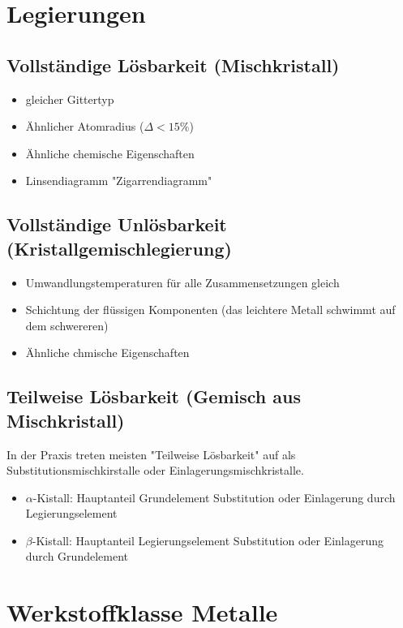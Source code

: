\documentclass[8.5pt,twocolumn]{extarticle}
\begin{document}
    \section*{Legierungen}
    \subsection{Vollständige Lösbarkeit (Mischkristall)}
    \begin{itemize}[label={}, leftmargin=*,  itemsep=0.01em]
        \item gleicher Gittertyp
        \item Ähnlicher Atomradius ($\Delta < 15\%$)
        \item Ähnliche chemische Eigenschaften
        \item Linsendiagramm "Zigarrendiagramm"
    \end{itemize}
    \subsection{Vollständige Unlösbarkeit (Kristallgemischlegierung)}
    \begin{itemize}[label={}, leftmargin=*,  itemsep=0.01em]
        \item Umwandlungstemperaturen für alle Zusammensetzungen gleich
        \item Schichtung der flüssigen Komponenten (das leichtere Metall schwimmt auf dem
        schwereren)
        \item Ähnliche chmische Eigenschaften
    \end{itemize}
    \subsection{Teilweise Lösbarkeit (Gemisch aus Mischkristall)}
    In der Praxis treten meisten "Teilweise Lösbarkeit" auf als Substitutionsmischkirstalle oder Einlagerungsmischkristalle.
    \begin{itemize}[label={}, leftmargin=*, itemsep=0.01em]
        \item $\alpha$-Kistall: Hauptanteil Grundelement Substitution oder Einlagerung durch Legierungselement
        \item $\beta$-Kistall: Hauptanteil Legierungselement Substitution oder Einlagerung durch Grundelement
    \end{itemize}
    \section{Werkstoffklasse Metalle}
\end{document}
